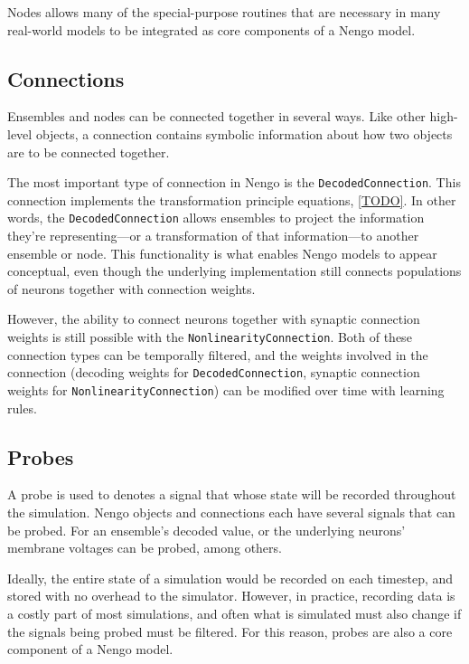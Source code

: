 \documentclass{frontiersSCNS}
\begin{document}
Nodes allows many of the special-purpose
routines that are necessary in many real-world
models to be integrated
as core components of a Nengo model.

\subsection{Connections}

Ensembles and nodes can be connected together
in several ways.
Like other high-level objects,
a connection contains symbolic information
about how two objects are to be connected
together.

The most important type of connection
in Nengo is the \texttt{DecodedConnection}.
This connection implements
the transformation principle equations,
\eqref{TODO}.
In other words, the \texttt{DecodedConnection}
allows ensembles to project
the information they're representing---or
a transformation of that information---to
another ensemble or node.
This functionality is what enables Nengo models
to appear conceptual,
even though the underlying implementation
still connects populations of neurons
together with connection weights.

However, the ability to connect neurons together
with synaptic connection weights is still possible
with the \texttt{NonlinearityConnection}.
Both of these connection types
can be temporally filtered,
and the weights involved in the connection
(decoding weights for \texttt{DecodedConnection},
synaptic connection weights for \texttt{NonlinearityConnection})
can be modified over time with learning rules.

\subsection{Probes}

A probe is used to denotes a signal that
whose state will be recorded
throughout the simulation.
Nengo objects and connections
each have several signals that can be probed.
For an ensemble's decoded value,
or the underlying neurons' membrane voltages
can be probed, among others.

Ideally, the entire state of a simulation
would be recorded on each timestep,
and stored with no overhead to the simulator.
However, in practice, recording data
is a costly part of most simulations,
and often what is simulated must also change
if the signals being probed must be filtered.
For this reason, probes are also
a core component of a Nengo model.
\end{document}
